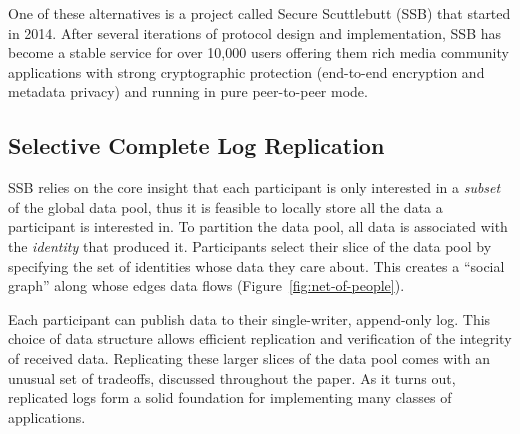 \documentclass[9pt,sigconf,rewiew]{acmart}
\begin{document}
One of these alternatives is a project called Secure Scuttlebutt (SSB)
that started in 2014. After several iterations of protocol design and
implementation, SSB has become a stable service for over 10,000 users
offering them rich media community applications with strong
cryptographic protection (end-to-end encryption and metadata privacy)
and running in pure peer-to-peer mode.

\subsection*{Selective Complete Log Replication}

SSB relies on the core insight that each  participant is only interested in a \textit{subset} of the global data pool, thus it is feasible to locally store all the data a participant is interested in. To partition the data pool, all data is associated with the \textit{identity} that produced it. Participants select their slice of the data pool by specifying the set of identities whose data they care about. This creates a ``social graph'' along whose edges data flows (Figure~\ref{fig:net-of-people}).

Each participant can publish data to their single-writer, append-only log. This choice of data structure allows efficient replication and verification of the integrity of received data. Replicating these larger slices of the data pool comes with an unusual set of tradeoffs, discussed throughout the paper. As it turns out, replicated logs form a solid foundation for implementing many classes of applications.

\end{document}
